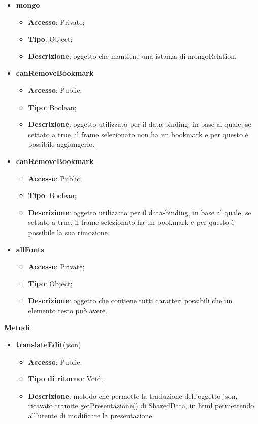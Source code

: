 {{\begin{itemize}
			\item \textbf{mongo}
			\begin{itemize}
				\item \textbf{Accesso}: Private;
				\item \textbf{Tipo}: Object;
				\item \textbf{Descrizione}: oggetto che mantiene una istanza di mongoRelation.
			\end{itemize}
			\item \textbf{canRemoveBookmark}
			\begin{itemize}
				\item \textbf{Accesso}: Public;
				\item \textbf{Tipo}: Boolean;
				\item \textbf{Descrizione}: oggetto utilizzato per il data-binding, in base al quale, se settato a true, il frame selezionato non ha un bookmark e per questo è possibile aggiungerlo.
			\end{itemize}
			\item \textbf{canRemoveBookmark}
			\begin{itemize}
				\item \textbf{Accesso}: Public;
				\item \textbf{Tipo}: Boolean;
				\item \textbf{Descrizione}: oggetto utilizzato per il data-binding, in base al quale, se settato a true, il frame selezionato ha un bookmark e per questo è possibile la sua rimozione.
			\end{itemize}
			\item \textbf{allFonts}
			\begin{itemize}
				\item \textbf{Accesso}: Private;
				\item \textbf{Tipo}: Object;
				\item \textbf{Descrizione}: oggetto che contiene tutti caratteri possibili che un elemento testo può avere.
			\end{itemize}
	    \end{itemize}
		\textbf{Metodi}
		\begin{itemize}
			\item \textbf{translateEdit}(json)
			\begin{itemize}
				\item \textbf{Accesso}: Public;
				\item \textbf{Tipo di ritorno}: Void;
				\item \textbf{Descrizione}: metodo che permette la traduzione dell'oggetto json, ricavato tramite getPresentazione() di SharedData, in html permettendo all'utente di modificare la presentazione.

\end{itemize}
\end{itemize}}}
